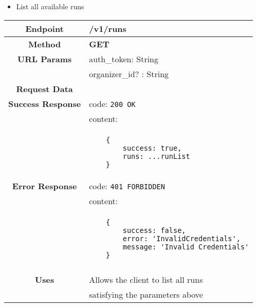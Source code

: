     \begin{itemize}
            \item List all available runs
        \end{itemize}
        \begin{adjustwidth}{1cm}{}
            \begin{longtable}{|c|l|}
                \hline
                \textbf{Endpoint} & /v1/runs \\
                \hline
                \textbf{Method} & \textbf{GET} \\
                \hline
                \textbf{URL Params} &  auth\_token:  String \\
                &                      organizer\_id? : String\\
                \hline
                \textbf{Request Data} &  \\
                \hline
                \textbf{Success Response} & code: \texttt{200 OK} \\
                &                           content: \\
                & \begin{minipage}[t]{0.5\textwidth}
                    \begin{adjustwidth}{1.5cm}{}
                    \begin{verbatim}
    {
        success: true, 
        runs: ...runList
    }
                    \end{verbatim}
                    \end{adjustwidth}
                  \end{minipage} \\
                  \hline
                \textbf{Error Response} &  code: \texttt{401 FORBIDDEN} \\
                &                         content: \\
                & \begin{minipage}[t]{0.7\textwidth}
                    \begin{adjustwidth}{1.5cm}{}
                    \begin{verbatim}
    {
        success: false, 
        error: 'InvalidCredentials',
        message: 'Invalid Credentials'
    }
                    \end{verbatim}
                    \end{adjustwidth}
                  \end{minipage} \\\\
                  \hline
                \textbf{Uses} & Allows the client to list all runs\\ 
                              &  satisfying the parameters above \\
                \hline
                

\end{longtable}
\end{adjustwidth}

